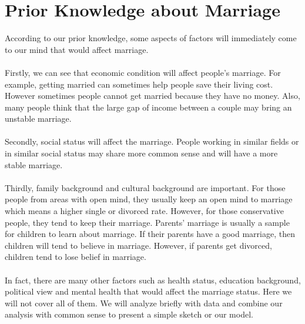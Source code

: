 \documentclass[12pt]{article}
\begin{document}
	\section{Prior Knowledge about Marriage}
	According to our prior knowledge, some aspects of factors will immediately come to our mind that would affect marriage. \\\\
	Firstly, we can see that economic condition will affect people's marriage. For example, getting married can sometimes help people save their living cost. However sometimes people cannot get married because they have no money. Also, many people think that the large gap of income between a couple may bring an unstable marriage.\\\\
	Secondly, social status will affect the marriage. People working in similar fields or in similar social status may share more common sense and will have a more stable marriage.\\\\
	Thirdly, family background and cultural background are important. For those people from areas with open mind, they usually keep an open mind to marriage which means a higher single or divorced rate. However, for those conservative people, they tend to keep their marriage. Parents' marriage is usually a sample for children to learn about marriage. If their parents have a good marriage, then children will tend to believe in marriage. However, if parents get divorced, children tend to lose belief in marriage.\\\\
	In fact, there are many other factors such as health status, education background, political view and mental health that would affect the marriage status. Here we will not cover all of them. We will analyze briefly with data and combine our analysis with common sense to present a simple sketch or our model.\\
\end{document}
